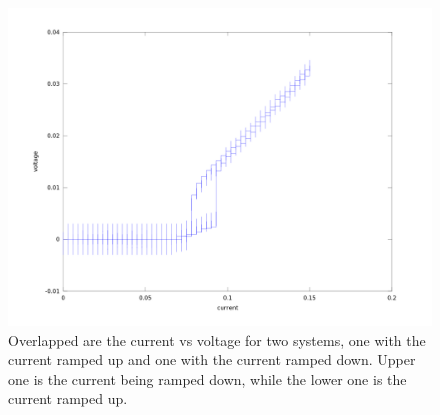 \begin{figure}[htbp]
\begin{center}
\includegraphics[scale=.50]{JvV.png}
\caption{ Overlapped are the current vs voltage for two systems, one with the current ramped up and one with the current ramped down. Upper one is the current being ramped down, while the lower one is the current ramped up.}
\label{hysteresis}
\end{center}
\end{figure}
 

